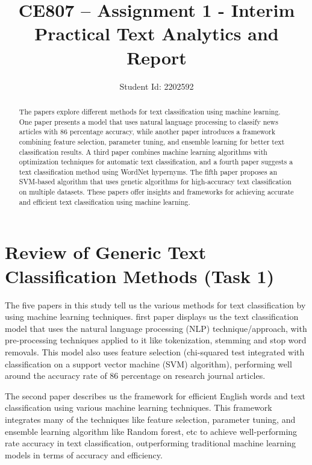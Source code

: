 \documentclass[11pt,a4paper]{article}
\title{CE807 – Assignment 1 - Interim Practical Text Analytics and Report}
\author{Student Id: 2202592}
\begin{document}
\maketitle

\begin{abstract}

The papers explore different methods for text classification using machine learning. One paper presents a model that uses natural language processing to classify news articles with 86 percentage accuracy, while another paper introduces a framework combining feature selection, parameter tuning, and ensemble learning for better text classification results. A third paper combines machine learning algorithms with optimization techniques for automatic text classification, and a fourth paper suggests a text classification method using WordNet hypernyms. The fifth paper proposes an SVM-based algorithm that uses genetic algorithms for high-accuracy text classification on multiple datasets. These papers offer insights and frameworks for achieving accurate and efficient text classification using machine learning.

\end{abstract}

\section{Review of Generic Text Classification Methods (Task 1)}
The five papers in this study tell us the various methods for text classification by using machine learning techniques. first paper \cite{1} displays us the text classification model that uses the natural language processing (NLP) technique/approach, with pre-processing techniques applied to it like tokenization, stemming and stop word removals. This model also uses feature selection (chi-squared test integrated with classification on a support vector machine (SVM) algorithm), performing well around the accuracy rate of 86 percentage on research journal articles.

The second paper \cite{2} describes us the framework for efficient English words and text classification using various machine learning techniques. This framework integrates many of the techniques like  feature selection, parameter tuning, and ensemble learning algorithm like Random forest, etc to achieve well-performing rate accuracy in text classification, outperforming traditional machine learning models in terms of accuracy and efficiency.
\end{document}
